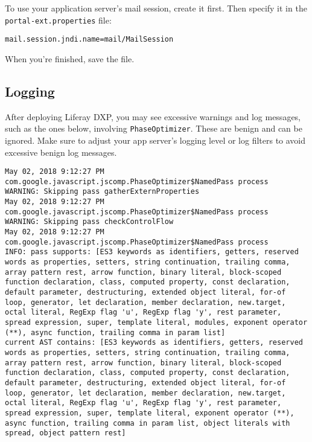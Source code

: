 To use your application server's mail session, create it first. Then
specify it in the \texttt{portal-ext.properties} file:

\begin{verbatim}
mail.session.jndi.name=mail/MailSession
\end{verbatim}

When you're finished, save the file.

\subsection{Logging}\label{logging}

After deploying Liferay DXP, you may see excessive warnings and log
messages, such as the ones below, involving \texttt{PhaseOptimizer}.
These are benign and can be ignored. Make sure to adjust your app
server's logging level or log filters to avoid excessive benign log
messages.

\begin{verbatim}
May 02, 2018 9:12:27 PM com.google.javascript.jscomp.PhaseOptimizer$NamedPass process
WARNING: Skipping pass gatherExternProperties
May 02, 2018 9:12:27 PM com.google.javascript.jscomp.PhaseOptimizer$NamedPass process
WARNING: Skipping pass checkControlFlow
May 02, 2018 9:12:27 PM com.google.javascript.jscomp.PhaseOptimizer$NamedPass process
INFO: pass supports: [ES3 keywords as identifiers, getters, reserved words as properties, setters, string continuation, trailing comma, array pattern rest, arrow function, binary literal, block-scoped function declaration, class, computed property, const declaration, default parameter, destructuring, extended object literal, for-of loop, generator, let declaration, member declaration, new.target, octal literal, RegExp flag 'u', RegExp flag 'y', rest parameter, spread expression, super, template literal, modules, exponent operator (**), async function, trailing comma in param list]
current AST contains: [ES3 keywords as identifiers, getters, reserved words as properties, setters, string continuation, trailing comma, array pattern rest, arrow function, binary literal, block-scoped function declaration, class, computed property, const declaration, default parameter, destructuring, extended object literal, for-of loop, generator, let declaration, member declaration, new.target, octal literal, RegExp flag 'u', RegExp flag 'y', rest parameter, spread expression, super, template literal, exponent operator (**), async function, trailing comma in param list, object literals with spread, object pattern rest]
\end{verbatim}


